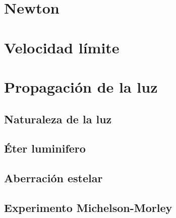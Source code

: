 \documentclass[../main]{subfiles}
\begin{document}
\chapter{Newton}

\chapter{Velocidad límite}

\chapter{Propagación de la luz}

\section{Naturaleza de la luz}

\section{Éter luminifero}

\section{Aberración estelar}

\section{Experimento Michelson-Morley}
\end{document}
